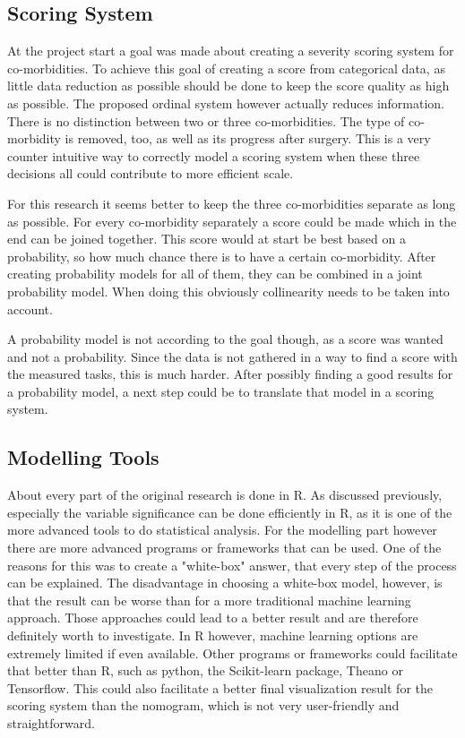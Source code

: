 \documentclass[10pt,a4paper]{article}
\begin{document}
	\subsection{Scoring System}
	
	At the project start a goal was made about creating a severity scoring system for co-morbidities. To achieve this goal of creating a score from categorical data, as little data reduction as possible should be done to keep the score quality as high as possible. The proposed ordinal system however actually reduces information. There is no distinction between two or three co-morbidities. The type of co-morbidity is removed, too, as well as its progress after surgery. This is a very counter intuitive way to correctly model a scoring system when these three decisions all could contribute to more efficient scale. 
	
	For this research it seems better to keep the three co-morbidities separate as long as possible. For every co-morbidity separately a score could be made which in the end can be joined together. This score would at start be best based on a probability, so how much chance there is to have a certain co-morbidity. After creating probability models for all of them, they can be combined in a joint probability model. When doing this obviously collinearity needs to be taken into account. 
	
	A probability model is not according to the goal though, as a score was wanted and not a probability. Since the data is not gathered in a way to find a score with the measured tasks, this is much harder. After possibly finding a good results for a probability model, a next step could be to translate that model in a scoring system.
	
	\subsection{Modelling Tools}

	About every part of the original research is done in R. As discussed previously, especially the variable significance can be done efficiently in R, as it is one of the more advanced tools to do statistical analysis. For the modelling part however there are more advanced programs or frameworks that can be used. One of the reasons for this was to create a "white-box" answer, that every step of the process can be explained. The disadvantage in choosing a white-box model, however, is that the result can be worse than for a more traditional machine learning approach. Those approaches could lead to a better result and are therefore definitely worth to investigate. In R however, machine learning options are extremely limited if even available. Other programs or frameworks could facilitate that better than R, such as python, the Scikit-learn package, Theano or Tensorflow. This could also facilitate a better final visualization result for the scoring system than the nomogram, which is not very user-friendly and straightforward.
	
\end{document}
